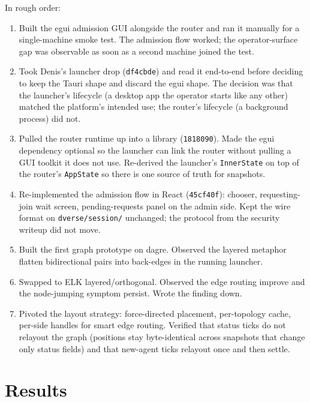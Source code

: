 \documentclass[11pt,a4paper]{article}
\begin{document}
In rough order:

\begin{enumerate}[leftmargin=1.6em]
  \item Built the egui admission GUI alongside the router and
        ran it manually for a single-machine smoke test. The
        admission flow worked; the operator-surface gap was
        observable as soon as a second machine joined the test.
  \item Took Denis's launcher drop (\texttt{df4cbde}) and read
        it end-to-end before deciding to keep the Tauri shape
        and discard the egui shape. The decision was that the
        launcher's lifecycle (a desktop app the operator starts
        like any other) matched the platform's intended use; the
        router's lifecycle (a background process) did not.
  \item Pulled the router runtime up into a library
        (\texttt{1818090}). Made the egui dependency optional so
        the launcher can link the router without pulling a GUI
        toolkit it does not use. Re-derived the launcher's
        \texttt{InnerState} on top of the router's
        \texttt{AppState} so there is one source of truth for
        snapshots.
  \item Re-implemented the admission flow in React
        (\texttt{45cf40f}): chooser, requesting-join wait
        screen, pending-requests panel on the admin side. Kept
        the wire format on \texttt{dverse/session/} unchanged;
        the protocol from the security writeup did not move.
  \item Built the first graph prototype on dagre. Observed the
        layered metaphor flatten bidirectional pairs into
        back-edges in the running launcher.
  \item Swapped to ELK layered/orthogonal. Observed the edge
        routing improve and the node-jumping symptom persist.
        Wrote the finding down.
  \item Pivoted the layout strategy: force-directed placement,
        per-topology cache, per-side handles for smart edge
        routing. Verified that status ticks do not relayout the
        graph (positions stay byte-identical across snapshots
        that change only status fields) and that new-agent
        ticks relayout once and then settle.
\end{enumerate}

\section{Results}
\end{document}
